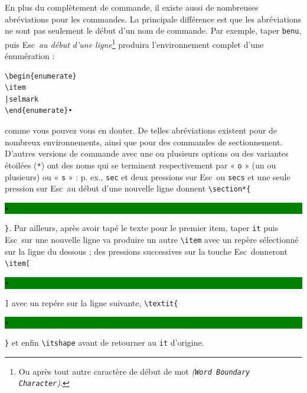 \documentclass[11pt,french]{article}
\newcommand{\esckey}{\textsf{Esc}}
\newcommand{\selmark}{\colorbox{green}{\rule[-0.5ex]{0ex}{2.1ex}\texttt{•}}}
\begin{document}
En plus du complètement de commande, il existe aussi de nombreuses abréviations pour les commandes. La 
principale différence est que les abréviations ne sont pas seulement le début d'un nom de commande. Par exemple, 
taper \texttt{benu}, puis \esckey\ \emph{au début d'une ligne}\footnote{Ou après tout autre caractère de début de mot \emph{(\texttt{Word Boundary Character})}.} produira l'environnement complet d'une énumération :
\begin{verbatim}
\begin{enumerate}
\item
|selmark
\end{enumerate}•
\end{verbatim}
comme vous pouvez vous en douter. De telles abréviations existent pour de nombreux environnements, ainsi que pour des commandes de sectionnement. D'autres versions de commande avec une ou plusieurs options ou des variantes étoilées (\texttt{*}) ont des noms qui se terminent respectivement par « \texttt{o} » (un ou plusieurs) ou « \texttt{s} » : p. ex., \texttt{sec} et deux pressions sur \esckey\ ou \texttt{secs} et une seule pression sur \esckey\ au début d'une nouvelle ligne donnent \verb|\section*{|\selmark\verb|}|. Par ailleurs, après avoir tapé le texte pour le premier item, taper \texttt{it} puis \esckey\ sur une nouvelle ligne va produire un autre \verb|\item| avec un repère sélectionné sur la ligne du dessous ; des pressions successives sur la touche \esckey\ donneront \verb|\item[|\selmark\verb|]| avec un repére sur la ligne suivante, \verb|\textit{|\selmark\verb|}| et enfin \verb|\itshape| avant de retourner au \texttt{it} d'origine.
\end{document}
